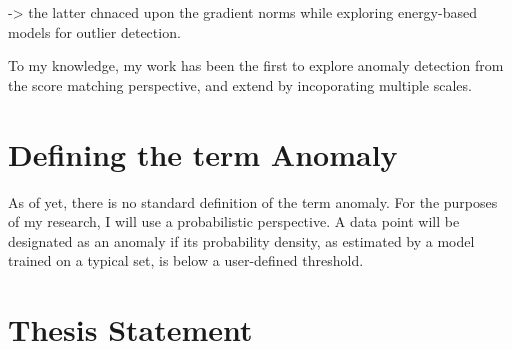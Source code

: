 -> the latter chnaced upon the gradient norms while exploring  energy-based models for outlier detection.

To my knowledge, my work has been the first to explore anomaly detection from the score matching perspective, and extend by incoporating multiple scales.


\section{Defining the term Anomaly}
As of yet, there is no standard definition of the term anomaly. 
For the purposes of my research, I will use a probabilistic perspective. A data point will be designated as an anomaly if its probability density, as estimated by a model trained on a typical set, is below a user-defined threshold. 


\section{Thesis Statement}

